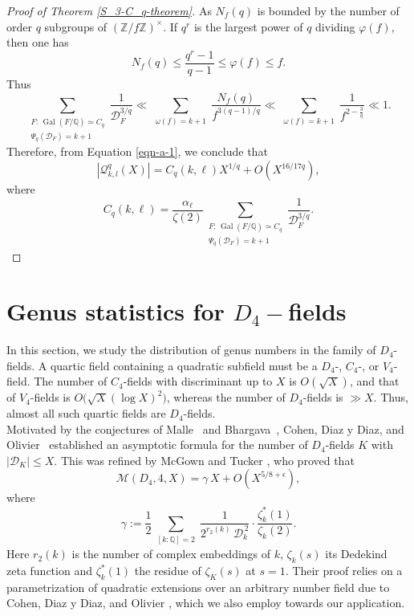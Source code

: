\documentclass[11pt,reqno]{amsart}
\newcommand{\cD}{\mathcal{D}}
\newcommand{\cM}{\mathcal{M}}
\newcommand{\cQ}{\mathcal{Q}}
\DeclareMathOperator{\Gal}{Gal}
\theoremstyle{definition}
\theoremstyle{remark}
\begin{document}
\begin{proof}[Proof of Theorem \ref{S_3-C_q-theorem}]
As $N_f(q)$ is bounded by the number of order $q$ subgroups of
$(\mathbb{Z}/f\mathbb{Z})^\times$. If $q^{r}$ is the largest power of $q$ dividing $\varphi(f)$, then one has 
\[
    N_f(q)
    \le \frac{q^{r}-1}{q-1}
    \le \varphi(f)
    \le f.
\]
Thus
\begin{equation*}
\sum_{\substack{
        F:\, \Gal(F/\mathbb{Q})\simeq C_q \\ \Psi_q(\mathcal{D}_F)=k+1}
        }
\frac{1}{\mathcal{D}_F^{3/q}}
\ll
\sum_{\substack{\omega(f)=k+1}}
\frac{N_f(q)}{f^{3(q-1)/q}}
\ll
\sum_{\substack{\omega(f)=k+1}}
\frac{1}{f^{2-\frac{3}{q}}} \ll 1. 
\end{equation*}
Therefore, from Equation \eqref{eqn-a-1}, we conclude that
\begin{equation*}
    |\cQ^q_{k,l}(X)| = C_q(k,\ell) X^{1/q} + O(X^{16/17q}),
\end{equation*}
where
\begin{equation}\label{implied-constant-1}
    C_q(k,\ell)
    =
    \frac{\alpha_{\ell}}{\zeta(2)}
    \sum_{\substack{
        F:\, \Gal(F/\mathbb{Q})\simeq C_q\\
        \Psi_q(\mathcal{D}_F)=k+1}}
    \frac{1}{\mathcal{D}_F^{3/q}}.
\end{equation}
\end{proof}


\section{\bf Genus statistics for $D_4-$fields}\label{D_4}
\medskip

In this section, we study the distribution of genus numbers in the family of $D_4$-fields. A quartic field containing a quadratic subfield must be a $D_4$-, $C_4$-, or $V_4$-field. The number of $C_4$-fields with discriminant up to $X$ is $O(\sqrt{X})$, and that of $V_4$-fields is $O\bigl(\sqrt{X}(\log X)^2\bigr)$, whereas the number of $D_4$-fields is $\gg X$. Thus, almost all such quartic fields are $D_4$-fields.\\

Motivated by the conjectures of Malle~\cite{Mal04} and Bhargava~\cite{Bha07}, Cohen, Diaz y Diaz, and Olivier~\cite{CDO02} established an asymptotic formula for the number of $D_4$-fields $K$ with $|\cD_K|\leq X$. This was refined by McGown and Tucker \cite{McTu24}, who proved that
\begin{equation*}
    \cM(D_4, 4, X) =  \gamma\, X + O(X^{5/8+\epsilon}), 
\end{equation*}
where
\begin{equation*}
    \gamma:=\frac12
      \sum_{\substack{ [k:\mathbb{Q}]=2}}
      \frac{1}{2^{r_2(k)}\,\mathcal{D}_k^{\,2}}
      \cdot
      \frac{\zeta_k^{*}(1)}{\zeta_k(2)}.
\end{equation*}
Here $r_2(k)$ is the number of complex embeddings of $k$, $\zeta_k(s)$ its Dedekind zeta function and $\zeta_k^{*}(1)$ the
residue of $\zeta_K(s)$ at $s=1$. Their proof relies on a parametrization of quadratic extensions over an arbitrary number field due to Cohen, Diaz y Diaz, and Olivier \cite{CDO02}, which we also employ towards our application.\\
\end{document}

